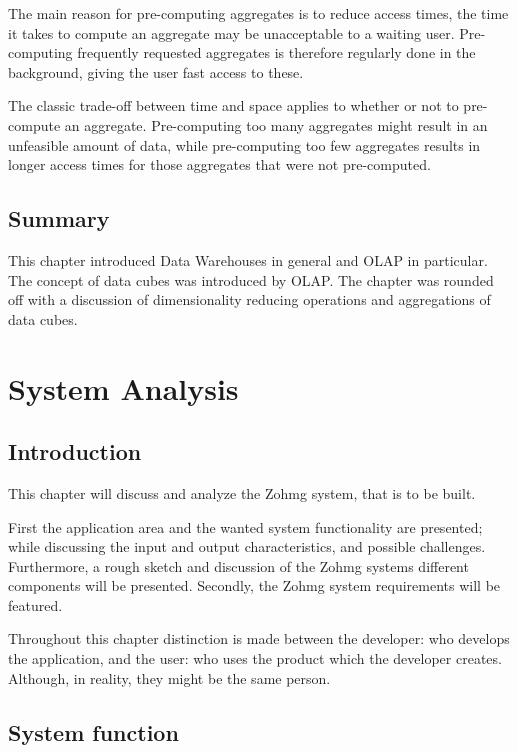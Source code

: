The main reason for pre-computing aggregates is to reduce access times, the
time it takes to compute an aggregate may be unacceptable to a waiting
user. Pre-computing frequently requested aggregates is therefore regularly
done in the background, giving the user fast access to these.
\cite{olap_solutions}

The classic trade-off between time and space applies to whether or not to
pre-compute an aggregate. Pre-computing too many aggregates might result in an
unfeasible amount of data, while pre-computing too few aggregates results in
longer access times for those aggregates that were not pre-computed.


\section{Summary}

This chapter introduced Data Warehouses in general and OLAP in particular. The
concept of data cubes was introduced by OLAP. The chapter was rounded off with
a discussion of dimensionality reducing operations and aggregations of data
cubes.



\chapter{System Analysis}



\section*{Introduction}

This chapter will discuss and analyze the Zohmg system, that is to be built.

First the application area and the wanted system functionality are presented;
while discussing the input and output characteristics, and possible challenges.
Furthermore, a rough sketch and discussion of the Zohmg systems different
components will be presented. Secondly, the Zohmg system requirements will be
featured.

Throughout this chapter distinction is made between the developer: who develops
the application, and the user: who uses the product which the developer
creates. Although, in reality, they might be the same person.


\section{System function}

